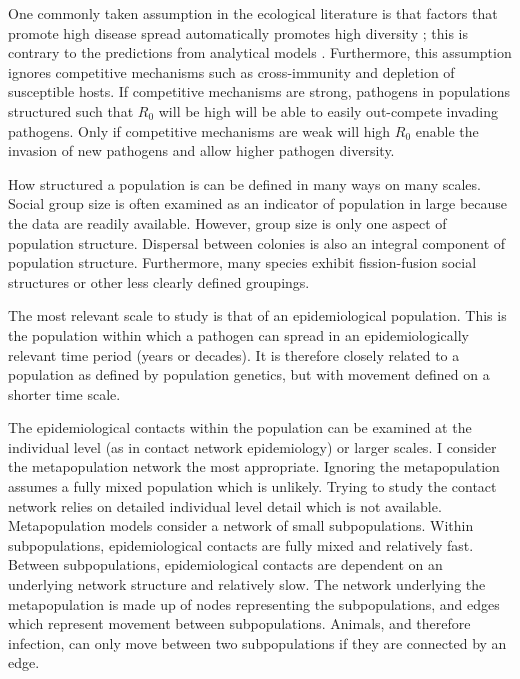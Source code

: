 One commonly taken assumption in the ecological literature is that factors that promote high disease spread automatically promotes high diversity \cite{nunn2003comparative, morand2000wormy, poulin2014parasite, poulin2000diversity, altizer2003social}; this is contrary to the predictions from analytical models \cite{qiu2013vector, allen2004sis, nunes2006localized}. 
Furthermore, this assumption ignores competitive mechanisms such as cross-immunity and depletion of susceptible hosts.
If competitive mechanisms are strong, pathogens in populations structured such that $R_0$ will be high will be able to easily out-compete invading pathogens.
Only if competitive mechanisms are weak will high $R_0$  enable the invasion of new pathogens and allow higher pathogen diversity.


How structured a population is can be defined in many ways on many scales.
Social group size is often examined as an indicator of population in large because the data are readily available.
However, group size is only one aspect of population structure.
Dispersal between colonies is also an integral component of population structure.
Furthermore, many species exhibit fission-fusion social structures or other less clearly defined groupings.

The most relevant scale to study is that of an epidemiological population.
This is the population within which a pathogen can spread in an epidemiologically relevant time period (years or decades).
It is therefore closely related to a population as defined by population genetics, but with movement defined on a shorter time scale.

The epidemiological contacts within the population can be examined at the individual level (as in contact network epidemiology) or larger scales.
I consider the metapopulation network the most appropriate.
Ignoring the metapopulation assumes a fully mixed population which is unlikely.
Trying to study the contact network relies on detailed individual level detail which is not available.
Metapopulation models consider a network of small subpopulations. 
Within subpopulations, epidemiological contacts are fully mixed and relatively fast.
Between subpopulations, epidemiological contacts are dependent on an underlying network structure and relatively slow.
The network underlying the metapopulation is made up of nodes representing the subpopulations, and edges which represent movement between subpopulations.
Animals, and therefore infection, can only move between two subpopulations if they are connected by an edge.

